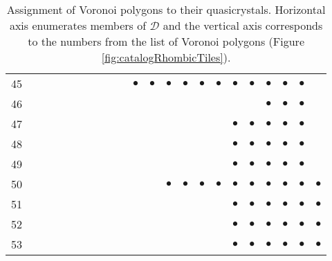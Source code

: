 \documentclass[text.tex]{subfiles}
\begin{document}
\begin{table}
\begin{tabular}{l|ccccccccccccccccccccc}
45  &           &           &           &           &           &           &           &           &           & $\bullet$ & $\bullet$ & $\bullet$ & $\bullet$ & $\bullet$ & $\bullet$ & $\bullet$ & $\bullet$ & $\bullet$ & $\bullet$ & $\bullet$ &           \\
46  &           &           &           &           &           &           &           &           &           &           &           &           &           &           &           &           &           & $\bullet$ & $\bullet$ & $\bullet$ &           \\ 
47  &           &           &           &           &           &           &           &           &           &           &           &           &           &           &           & $\bullet$ & $\bullet$ & $\bullet$ & $\bullet$ & $\bullet$ &           \\
48  &           &           &           &           &           &           &           &           &           &           &           &           &           &           &           & $\bullet$ & $\bullet$ & $\bullet$ & $\bullet$ & $\bullet$ &           \\ 
49  &           &           &           &           &           &           &           &           &           &           &           &           &           &           &           & $\bullet$ & $\bullet$ & $\bullet$ & $\bullet$ & $\bullet$ &           \\
50  &           &           &           &           &           &           &           &           &           &           &           & $\bullet$ & $\bullet$ & $\bullet$ & $\bullet$ & $\bullet$ & $\bullet$ & $\bullet$ & $\bullet$ & $\bullet$ & $\bullet$ \\ 
51  &           &           &           &           &           &           &           &           &           &           &           &           &           &           &           & $\bullet$ & $\bullet$ & $\bullet$ & $\bullet$ & $\bullet$ & $\bullet$ \\
52  &           &           &           &           &           &           &           &           &           &           &           &           &           &           &           & $\bullet$ & $\bullet$ & $\bullet$ & $\bullet$ & $\bullet$ & $\bullet$ \\
53  &           &           &           &           &           &           &           &           &           &           &           &           &           &           &           & $\bullet$ & $\bullet$ & $\bullet$ & $\bullet$ & $\bullet$ & $\bullet$ \\
\bottomrule
\end{tabular}
\caption{Assignment of Voronoi polygons to their quasicrystals. Horizontal axis enumerates members of $\mathcal{D}$ and the vertical axis corresponds to the numbers from the list of Voronoi polygons (Figure \ref{fig:catalogRhombicTiles}).}
\label{table:tiles1}
\end{table}

\restoregeometry
\end{document}
